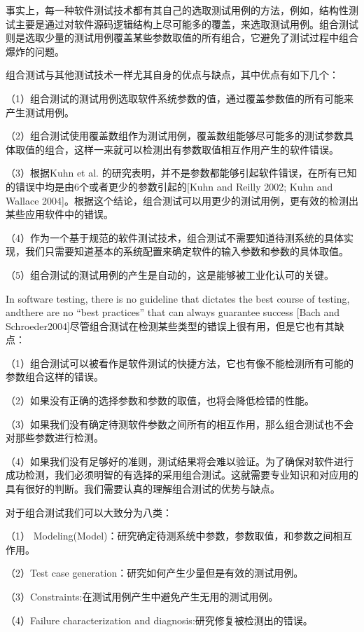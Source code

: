 \documentclass[10pt,journal,letterpaper,compsoc]{IEEEtran}
\begin{document}
\begin{CJK}{UTF8}{gkai}
事实上，每一种软件测试技术都有其自己的选取测试用例的方法，例如，结构性测试主要是通过对软件源码逻辑结构上尽可能多的覆盖，来选取测试用例。组合测试则是选取少量的测试用例覆盖某些参数取值的所有组合，它避免了测试过程中组合爆炸的问题。

组合测试与其他测试技术一样尤其自身的优点与缺点，其中优点有如下几个：

（1）组合测试的测试用例选取软件系统参数的值，通过覆盖参数值的所有可能来产生测试用例。

（2）组合测试使用覆盖数组作为测试用例，覆盖数组能够尽可能多的测试参数具体取值的组合，这样一来就可以检测出有参数取值相互作用产生的软件错误。

（3）根据Kuhn et al. 的研究表明，并不是参数都能够引起软件错误，在所有已知的错误中均是由6个或者更少的参数引起的[Kuhn and Reilly 2002; Kuhn and Wallace 2004]。根据这个结论，组合测试可以用更少的测试用例，更有效的检测出某些应用软件中的错误。

（4）作为一个基于规范的软件测试技术，组合测试不需要知道待测系统的具体实现，我们只需要知道基本的系统配置来确定软件的输入参数和参数的具体取值。

（5）组合测试的测试用例的产生是自动的，这是能够被工业化认可的关键。

In software testing, there is no guideline that dictates the best course of testing, andthere are no “best practices” that can always guarantee success [Bach and Schroeder2004]尽管组合测试在检测某些类型的错误上很有用，但是它也有其缺点：

（1）组合测试可以被看作是软件测试的快捷方法，它也有像不能检测所有可能的参数组合这样的错误。

（2）如果没有正确的选择参数和参数的取值，也将会降低检错的性能。

（3）如果我们没有确定待测软件参数之间所有的相互作用，那么组合测试也不会对那些参数进行检测。

（4）如果我们没有足够好的准则，测试结果将会难以验证。为了确保对软件进行成功检测，我们必须明智的有选择的采用组合测试。这就需要专业知识和对应用的具有很好的判断。我们需要认真的理解组合测试的优势与缺点。

对于组合测试我们可以大致分为八类：

（1） Modeling(Model)：研究确定待测系统中参数，参数取值，和参数之间相互作用。

（2）Test case generation：研究如何产生少量但是有效的测试用例。

（3）Constraints:在测试用例产生中避免产生无用的测试用例。

（4）Failure characterization and diagnosis:研究修复被检测出的错误。


\end{CJK}
\end{document}
